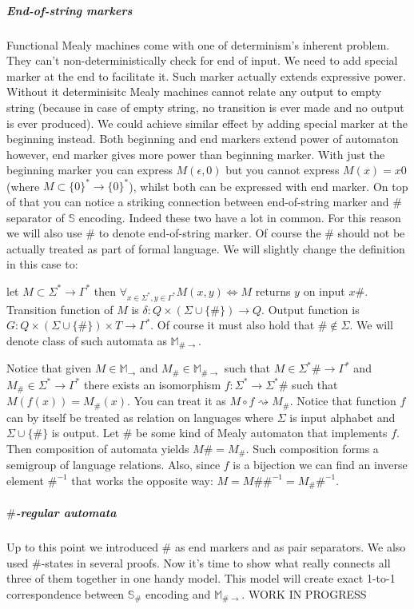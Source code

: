 \documentclass[12pt]{article}
\begin{document}
\subparagraph{End-of-string markers} Functional Mealy machines come with one of determinism's inherent problem. They can't non-deterministically check for end of input. We need to add special marker at the end to facilitate it. Such marker  actually extends expressive power. Without it determinisitc Mealy machines cannot relate any output to empty string (because in case of empty string, no transition is ever made and no output is ever produced). We could achieve similar effect by adding special marker at the beginning instead. Both beginning and end markers extend power of automaton however, end  marker gives more power than beginning marker. With just the beginning marker you can express $M(\epsilon,0)$ but you cannot express $M(x) = x0$ (where $M \subset \{0\}^* \rightarrow \{0\}^*$), whilst both can be expressed with end marker. On top of that you can notice a striking connection between end-of-string marker and $\#$ separator of $\mathbb{S}$ encoding. Indeed these two have a lot in common. For this reason we will also use $\#$ to denote end-of-string marker. Of course the $\#$ should not be actually treated as part  of formal language. We will slightly change the definition in this case to:


let $M\subset \Sigma^* \rightarrow \Gamma^*$ then $\forall_{x\in \Sigma^*,y\in\Gamma^*} M(x,y) \iff M$ returns $y$ on input $x\#$. Transition function of $M$ is $\delta : Q \times (\Sigma \cup \{\#\}) \rightarrow Q$. Output function is $G : Q \times (\Sigma \cup \{\#\}) \times T \rightarrow \Gamma^*$. Of course it must also hold that $\# \notin \Sigma$. We will denote class of such automata as $\mathbb{M}_{\#\rightarrow}$.

Notice that given $M \in \mathbb{M}_\rightarrow$ and $M_\# \in \mathbb{M}_{\#\rightarrow}$ such that $M \in \Sigma^*\# \rightarrow \Gamma^*$ and $M_\# \in \Sigma^* \rightarrow \Gamma^*$ there exists an isomorphism $f : \Sigma^* \rightarrow \Sigma^*\#$ such that $M(f(x)) = M_\#(x)$. You can treat it as $M \circ f \rightsquigarrow M_\#$. Notice that function $f$ can by itself be treated as relation on languages where $\Sigma$ is input alphabet and $\Sigma\cup\{\#\}$ is output. Let $\#$ be some kind of Mealy automaton that implements $f$. Then composition of automata yields $M\# = M_\#$. Such composition forms a semigroup of language relations. Also, since $f$ is a bijection we can find an inverse element $\#^{-1}$ that works the opposite way:  $M = M\#\#^{-1} = M_\#\#^{-1}$.


\subparagraph{$\#$-regular automata}Up to this point we introduced $\#$ as end markers and as pair separators. We also used $\#$-states in several proofs. Now it's time to show what really connects all three of them together in one handy model. This model will create exact 1-to-1 correspondence between $\mathbb{S}_\#$ encoding and $\mathbb{M}_{\#\rightarrow}$. WORK IN PROGRESS
\end{document}
